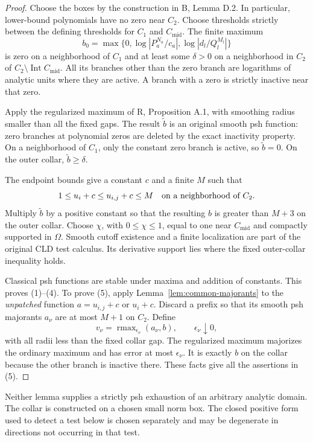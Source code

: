 \begin{proof}
Choose the boxes by the construction in \textup{B}, Lemma D.2. In
particular, lower-bound polynomials have no zero near $C_2$. Choose
thresholds strictly between the defining thresholds for $C_1$ and
$C_{\mathrm{mid}}$. The finite maximum
\[
 b_0=\max\{0,\log|P_a^{N_a}/c_a|,
                     \log|d_l/Q_l^{M_l}|\}
\]
is zero on a neighborhood of $C_1$ and at least some $\delta>0$ on a
neighborhood in $C_2$ of $C_2\setminus\operatorname{Int}C_{\mathrm{mid}}$.
All its branches other than the zero branch are logarithms of analytic
units where they are active. A branch with a zero is strictly inactive
near that zero.

Apply the regularized maximum of \textup{R}, Proposition A.1, with
smoothing radius smaller than all the fixed gaps. The result $\widetilde b$
is an original smooth psh function: zero branches at polynomial zeros
are deleted by the exact inactivity property. On a neighborhood of
$C_1$, only the constant zero branch is active, so $\widetilde b=0$.
On the outer collar, $\widetilde b\geq\delta$.

The endpoint bounds give a constant $c$ and a finite $M$ such that
\[
 1\leq u_i+c\leq u_{i,j}+c\leq M
 \quad\hbox{on a neighborhood of }C_2.
\]
Multiply $\widetilde b$ by a positive constant so that the resulting $b$
is greater than $M+3$ on the outer collar. Choose $\chi$, with
$0\leq\chi\leq1$, equal to one near $C_{\mathrm{mid}}$ and compactly
supported in $\Omega$. Smooth cutoff existence and a finite localization
are part of the original CLD test calculus. Its derivative support lies
where the fixed outer-collar inequality holds.

Classical psh functions are stable under maxima and addition of constants.
This proves (1)--(4). To prove (5), apply Lemma~\ref{lem:common-majorants}
to the \emph{unpatched} function $a=u_{i,j}+c$ or $u_i+c$. Discard a
prefix so that its smooth psh majorants $a_\nu$ are at most $M+1$ on
$C_2$. Define
\[
 v_\nu=\operatorname{rmax}_{\epsilon_\nu}(a_\nu,b),
 \qquad \epsilon_\nu\downarrow0,
\]
with all radii less than the fixed collar gap. The regularized maximum
majorizes the ordinary maximum and has error at most $\epsilon_\nu$.
It is exactly $b$ on the collar because the other branch is inactive
there. These facts give all the assertions in (5).
\end{proof}

\begin{remark}
Neither lemma supplies a strictly psh exhaustion of an arbitrary analytic
domain. The collar is constructed on a chosen small norm box. The closed
positive form used to detect a test below is chosen separately and may
be degenerate in directions not occurring in that test.
\end{remark}

